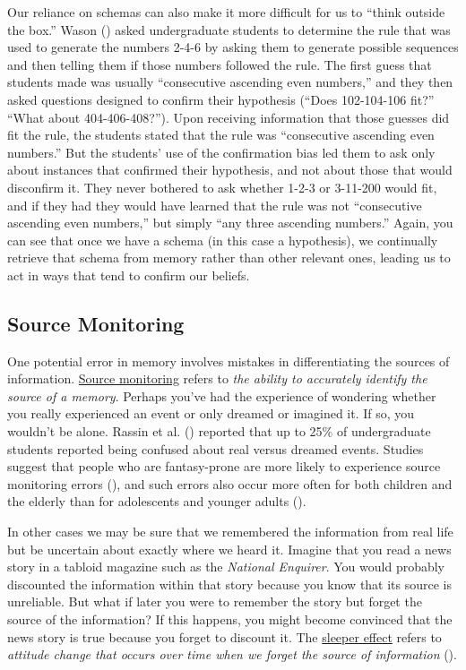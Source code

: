 \documentclass[
]{krantz}
\begin{document}
Our reliance on schemas can also make it more difficult for us to ``think outside the box.'' Wason () asked undergraduate students to determine the rule that was used to generate the numbers 2-4-6 by asking them to generate possible sequences and then telling them if those numbers followed the rule. The first guess that students made was usually ``consecutive ascending even numbers,'' and they then asked questions designed to confirm their hypothesis (``Does 102-104-106 fit?'' ``What about 404-406-408?''). Upon receiving information that those guesses did fit the rule, the students stated that the rule was ``consecutive ascending even numbers.'' But the students' use of the confirmation bias led them to ask only about instances that confirmed their hypothesis, and not about those that would disconfirm it. They never bothered to ask whether 1-2-3 or 3-11-200 would fit, and if they had they would have learned that the rule was not ``consecutive ascending even numbers,'' but simply ``any three ascending numbers.'' Again, you can see that once we have a schema (in this case a hypothesis), we continually retrieve that schema from memory rather than other relevant ones, leading us to act in ways that tend to confirm our beliefs.

\subsection*{Source Monitoring}\label{source-monitoring}


One potential error in memory involves mistakes in differentiating the sources of information. \hyperref[source-monitoring]{Source monitoring} refers to \emph{the ability to accurately identify the source of a memory}. Perhaps you've had the experience of wondering whether you really experienced an event or only dreamed or imagined it. If so, you wouldn't be alone. Rassin et al. () reported that up to 25\% of undergraduate students reported being confused about real versus dreamed events. Studies suggest that people who are fantasy-prone are more likely to experience source monitoring errors (), and such errors also occur more often for both children and the elderly than for adolescents and younger adults ().

In other cases we may be sure that we remembered the information from real life but be uncertain about exactly where we heard it. Imagine that you read a news story in a tabloid magazine such as the \emph{National Enquirer}. You would probably discounted the information within that story because you know that its source is unreliable. But what if later you were to remember the story but forget the source of the information? If this happens, you might become convinced that the news story is true because you forget to discount it. The \hyperref[sleeper-effect]{sleeper effect} refers to \emph{attitude change that occurs over time when we forget the source of information} ().
\end{document}
